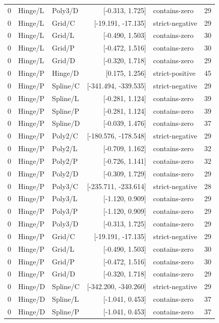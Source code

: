 \begin{longtable}{lllrlr}
0 & Hinge/L & Poly3/D & [-0.313, 1.725] & contains-zero & 29 \\
0 & Hinge/L & Grid/C & [-19.191, -17.135] & strict-negative & 29 \\
0 & Hinge/L & Grid/L & [-0.490, 1.503] & contains-zero & 30 \\
0 & Hinge/L & Grid/P & [-0.472, 1.516] & contains-zero & 30 \\
0 & Hinge/L & Grid/D & [-0.320, 1.718] & contains-zero & 29 \\
0 & Hinge/P & Hinge/D & [0.175, 1.256] & strict-positive & 45 \\
0 & Hinge/P & Spline/C & [-341.494, -339.535] & strict-negative & 29 \\
0 & Hinge/P & Spline/L & [-0.281, 1.124] & contains-zero & 39 \\
0 & Hinge/P & Spline/P & [-0.281, 1.124] & contains-zero & 39 \\
0 & Hinge/P & Spline/D & [-0.039, 1.476] & contains-zero & 37 \\
0 & Hinge/P & Poly2/C & [-180.576, -178.548] & strict-negative & 29 \\
0 & Hinge/P & Poly2/L & [-0.709, 1.162] & contains-zero & 32 \\
0 & Hinge/P & Poly2/P & [-0.726, 1.141] & contains-zero & 32 \\
0 & Hinge/P & Poly2/D & [-0.309, 1.729] & contains-zero & 29 \\
0 & Hinge/P & Poly3/C & [-235.711, -233.614] & strict-negative & 28 \\
0 & Hinge/P & Poly3/L & [-1.120, 0.909] & contains-zero & 29 \\
0 & Hinge/P & Poly3/P & [-1.120, 0.909] & contains-zero & 29 \\
0 & Hinge/P & Poly3/D & [-0.313, 1.725] & contains-zero & 29 \\
0 & Hinge/P & Grid/C & [-19.191, -17.135] & strict-negative & 29 \\
0 & Hinge/P & Grid/L & [-0.490, 1.503] & contains-zero & 30 \\
0 & Hinge/P & Grid/P & [-0.472, 1.516] & contains-zero & 30 \\
0 & Hinge/P & Grid/D & [-0.320, 1.718] & contains-zero & 29 \\
0 & Hinge/D & Spline/C & [-342.200, -340.260] & strict-negative & 29 \\
0 & Hinge/D & Spline/L & [-1.041, 0.453] & contains-zero & 37 \\
0 & Hinge/D & Spline/P & [-1.041, 0.453] & contains-zero & 37 \\

\end{longtable}
